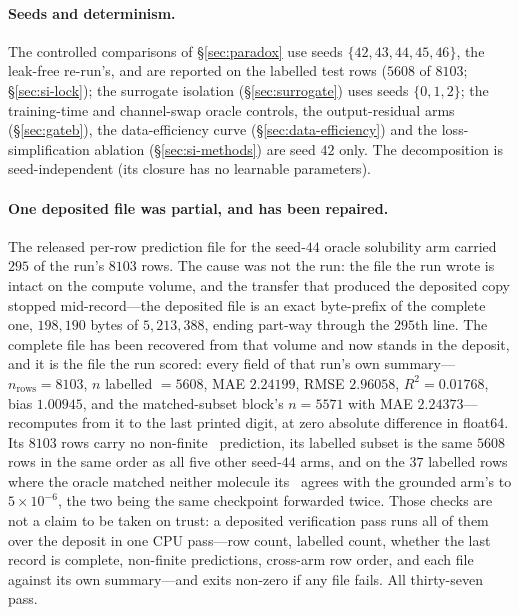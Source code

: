 \paragraph{Seeds and determinism.} The controlled comparisons of \S\ref{sec:paradox} use seeds
$\{42,43,44,45,46\}$, the leak-free re-run's, and are reported on the labelled test rows ($5608$ of
$8103$; \S\ref{sec:si-lock}); the
surrogate isolation (\S\ref{sec:surrogate}) uses seeds $\{0,1,2\}$; the training-time and
channel-swap oracle controls, the output-residual arms (\S\ref{sec:gateb}), the data-efficiency
curve (\S\ref{sec:data-efficiency}) and the loss-simplification ablation
(\S\ref{sec:si-methods}) are seed $42$ only.
The decomposition is seed-independent
(its closure has no learnable parameters).

\paragraph{One deposited file was partial, and has been repaired.} The released per-row prediction
file for the seed-$44$ oracle solubility arm carried $295$ of the run's $8103$ rows. The cause was
not the run: the file the run wrote is intact on the compute volume, and the transfer that produced
the deposited copy stopped mid-record---the deposited file is an exact byte-prefix of the complete
one, $198{,}190$ bytes of $5{,}213{,}388$, ending part-way through the $295$th line. The complete
file has been recovered from that volume and now stands in the deposit, and it is the file the run
scored: every field of that run's own summary---$n_{\text{rows}}=8103$, $n$ labelled $=5608$, MAE
$2.24199$, RMSE $2.96058$, $R^{2}=0.01768$, bias $1.00945$, and the matched-subset block's
$n=5571$ with MAE $2.24373$---recomputes from it to the last printed digit, at zero absolute
difference in float64. Its $8103$ rows carry no non-finite \lnx\ prediction, its labelled subset is
the same $5608$ rows in the same order as all five other seed-$44$ arms, and on the $37$ labelled
rows where the oracle matched neither molecule its \lng\ agrees with the grounded arm's to
$5\times10^{-6}$, the two being the same checkpoint forwarded twice. Those checks are not a claim to
be taken on trust: a deposited verification pass runs all
of them over the deposit in one CPU pass---row count, labelled count, whether the last record is
complete, non-finite predictions, cross-arm row order, and each file against its own
summary---and exits non-zero if any file fails. All thirty-seven pass.

